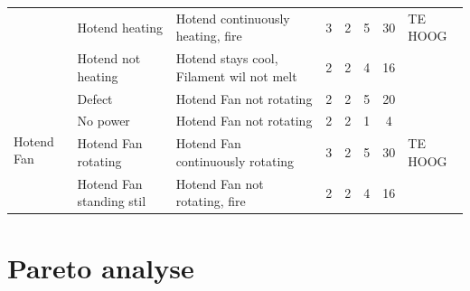 \documentclass{article}
\begin{document}
\begin{landscape}
\begin{longtable}{|l|l|l|c|c|c|c|l|}
                                            & Hotend heating            & Hotend continuously heating, fire                 & 3 & 2 & 5 & 30 & TE HOOG \\
                                            & Hotend not heating        & Hotend stays cool, Filament wil not melt          & 2 & 2 & 4 & 16 & \\ 
                                            \hline
        \multirow{4}{*}{Hotend Fan}         & Defect                    & Hotend Fan not rotating                           & 2 & 2 & 5 & 20 & \\
                                            & No power                  & Hotend Fan not rotating                           & 2 & 2 & 1 &  4 & \\
                                            & Hotend Fan rotating       & Hotend Fan continuously rotating                  & 3 & 2 & 5 & 30 & TE HOOG \\
                                            & Hotend Fan standing stil  & Hotend Fan not rotating, fire                     & 2 & 2 & 4 & 16 & \\ 
                                            \hline   
    \end{longtable}
\end{landscape}


\newpage
\section{Pareto analyse}


\newpage
% 
% 


\end{document}
